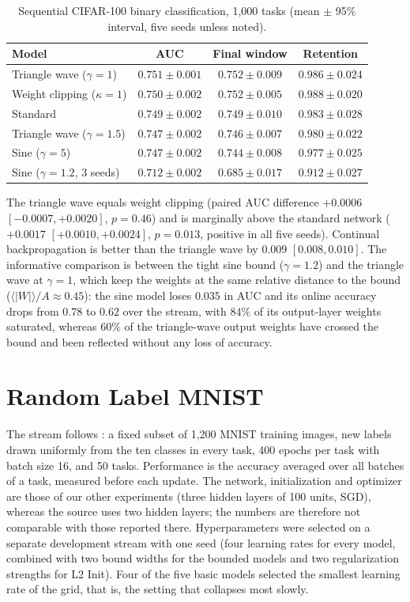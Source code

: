 \documentclass[11pt,a4paper]{article}
\begin{document}
\begin{table}[h]
  \centering\small
  \caption{Sequential CIFAR-100 binary classification, 1{,}000 tasks (mean $\pm$ 95\% interval, five seeds
  unless noted).}
  \label{tab:cifar}
  \begin{tabular}{@{}lccc@{}}
    \toprule
    Model & AUC & Final window & Retention\\
    \midrule
    Triangle wave ($\gamma=1$)   & $0.751\pm0.001$ & $0.752\pm0.009$ & $0.986\pm0.024$\\
    Weight clipping ($\kappa=1$) & $0.750\pm0.002$ & $0.752\pm0.005$ & $0.988\pm0.020$\\
    Standard                     & $0.749\pm0.002$ & $0.749\pm0.010$ & $0.983\pm0.028$\\
    Triangle wave ($\gamma=1.5$) & $0.747\pm0.002$ & $0.746\pm0.007$ & $0.980\pm0.022$\\
    Sine ($\gamma=5$)            & $0.747\pm0.002$ & $0.744\pm0.008$ & $0.977\pm0.025$\\
    Sine ($\gamma=1.2$, 3 seeds) & $0.712\pm0.002$ & $0.685\pm0.017$ & $0.912\pm0.027$\\
    \bottomrule
  \end{tabular}
\end{table}

The triangle wave equals weight clipping (paired AUC difference $+0.0006$ $[-0.0007,+0.0020]$, $p=0.46$) and is
marginally above the standard network ($+0.0017$ $[+0.0010,+0.0024]$, $p=0.013$, positive in all five seeds).
Continual backpropagation is better than the triangle wave by $0.009$ $[0.008,0.010]$. The informative
comparison is between the tight sine bound ($\gamma=1.2$) and the triangle wave at $\gamma=1$, which keep
the weights at the same relative distance to the bound ($\langle|W|\rangle/A\approx0.45$): the sine model
loses $0.035$ in AUC and its online accuracy drops from $0.78$ to $0.62$ over the stream, with $84\%$ of its
output-layer weights saturated, whereas $60\%$ of the triangle-wave output weights have crossed the bound and
been reflected without any loss of accuracy.

\section{Random Label MNIST}\label{app:rlmnist}

The stream follows \citet{kumar2023maintaining}: a fixed subset of 1{,}200 MNIST training images, new labels
drawn uniformly from the ten classes in every task, 400 epochs per task with batch size 16, and 50 tasks.
Performance is the accuracy averaged over all batches of a task, measured before each update. The network,
initialization and optimizer are those of our other experiments (three hidden layers of 100 units, SGD), whereas
the source uses two hidden layers; the numbers are therefore not comparable with those reported there.
Hyperparameters were selected on a separate development stream with one seed (four learning rates for every
model, combined with two bound widths for the bounded models and two regularization strengths for L2 Init).
Four of the five basic models selected the smallest learning rate of the grid, that is, the setting that
collapses most slowly.
\end{document}

